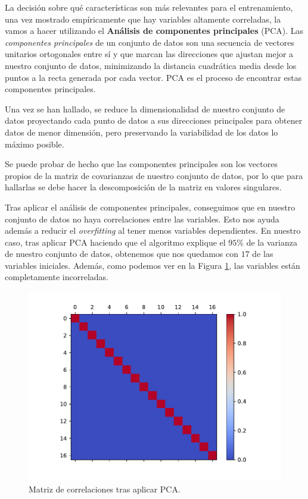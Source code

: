 \documentclass[a4paper, 20pt]{article}
\begin{document}
La decisión sobre qué características son más relevantes para el entrenamiento, una vez mostrado empíricamente que hay variables altamente correladas, la vamos a hacer utilizando el \textbf{Análisis de componentes principales} (PCA).  Las \emph{componentes principales} de un conjunto de datos son una secuencia de vectores unitarios ortogonales entre sí y que marcan las direcciones que ajustan mejor a nuestro conjunto de datos, minimizando la distancia cuadrática media desde los puntos a la recta generada por cada vector. PCA es el proceso de encontrar estas componentes principales.

Una vez se han hallado, se reduce la dimensionalidad de nuestro conjunto de datos proyectando cada punto de datos a sus direcciones principales para obtener datos de menor dimensión, pero preservando la variabilidad de los datos lo máximo posible.

Se puede probar de hecho que las componentes principales son los vectores propios de la matriz de covarianzas de nuestro conjunto de datos, por lo que para hallarlas se debe hacer la descomposición de la matriz en valores singulares.

Tras aplicar el análisis de componentes principales, conseguimos que en nuestro conjunto de datos no haya correlaciones entre las variables. Esto nos ayuda además a reducir el \emph{overfitting} al tener menos variables dependientes. En nuestro caso, tras aplicar PCA haciendo que el algoritmo explique el $95\%$ de la varianza de nuestro conjunto de datos, obtenemos que nos quedamos con $17$ de las variables iniciales. Además, como podemos ver en la Figura \ref{fig:corr-pca}, las variables están completamente incorreladas.

\begin{figure}[H]
  \centering
  \includegraphics[width=0.55\linewidth]{media/corr-pca.pdf}
  \caption{Matriz de correlaciones tras aplicar PCA. }
  \label{fig:corr-pca}
\end{figure}
\end{document}
